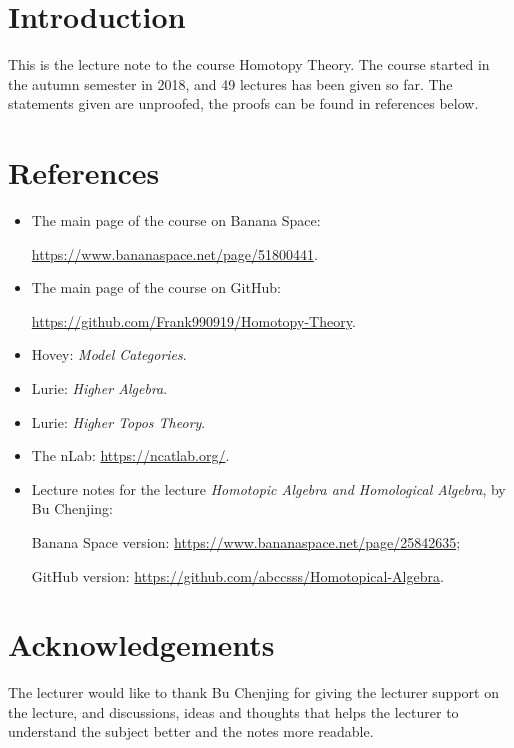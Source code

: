 \section*{Introduction}

This is the lecture note to the course Homotopy Theory. 
The course started in the autumn semester in 2018, and 49 lectures has been given so far.
The statements given are unproofed, the proofs can be found in references below.

\section*{References}

\begin{itemize}
\item The main page of the course on Banana Space: 

\url{https://www.bananaspace.net/page/51800441}.
\item The main page of the course on GitHub: 

\url{https://github.com/Frank990919/Homotopy-Theory}.
\item Hovey: \textit{Model Categories}.
\item Lurie: \textit{Higher Algebra}.
\item Lurie: \textit{Higher Topos Theory}.
\item The nLab: \url{https://ncatlab.org/}.
\item Lecture notes for the lecture \textit{Homotopic Algebra and Homological Algebra}, by Bu Chenjing:

Banana Space version: \url{https://www.bananaspace.net/page/25842635};

GitHub version: \url{https://github.com/abccsss/Homotopical-Algebra}.
\end{itemize}

\section*{Acknowledgements}

The lecturer would like to thank Bu Chenjing for giving the lecturer support on the lecture, and discussions, ideas and thoughts 
that helps the lecturer to understand the subject better and the notes more readable.